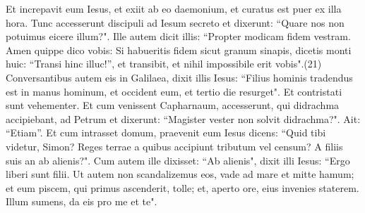 \begin{biblechapter}
\verse Et increpavit eum Iesus, et exiit ab eo daemonium, et curatus est puer ex illa hora. 
\verse Tunc accesserunt discipuli ad Iesum secreto et dixerunt: “Quare nos non potuimus eicere illum?". 
\verse Ille autem dicit illis: “Propter modicam fidem vestram. Amen quippe dico vobis: Si habueritis fidem sicut granum sinapis, dicetis monti huic: “Transi hinc illuc!”, et transibit, et nihil impossibile erit vobis".(21) 
\verse Conversantibus autem eis in Galilaea, dixit illis Iesus: “Filius hominis tradendus est in manus hominum, 
\verse et occident eum, et tertio die resurget". Et contristati sunt vehementer. 
\verse Et cum venissent Capharnaum, accesserunt, qui didrachma accipiebant, ad Petrum et dixerunt: “Magister vester non solvit didrachma?". 
\verse Ait: “Etiam”. Et cum intrasset domum, praevenit eum Iesus dicens: “Quid tibi videtur, Simon? Reges terrae a quibus accipiunt tributum vel censum? A filiis suis an ab alienis?". 
\verse Cum autem ille dixisset: “Ab alienis", dixit illi Iesus: “Ergo liberi sunt filii. 
\verse Ut autem non scandalizemus eos, vade ad mare et mitte hamum; et eum piscem, qui primus ascenderit, tolle; et, aperto ore, eius invenies staterem. Illum sumens, da eis pro me et te". 
\end{biblechapter}

